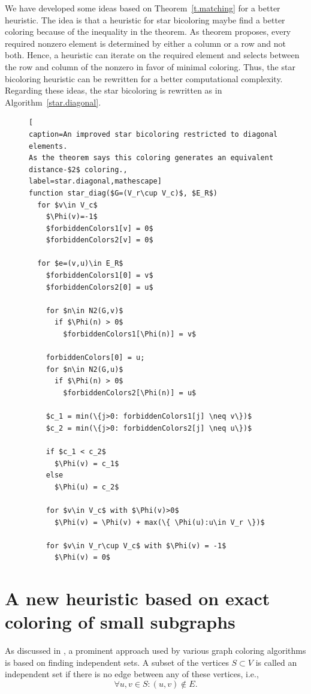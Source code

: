 \documentclass[12pt, twoside,a4paper,toc=bibliography]{scrbook}
\newcommand{\coderef}[1]{Algorithm~\protect\ref{#1}}
\begin{document}
We have developed some ideas based on Theorem~\ref{t.matching}
for a better heuristic. The idea is that a heuristic for star bicoloring maybe
find a better coloring because of the inequality in the theorem.
As theorem proposes, every required nonzero element
is determined by either a column or a row and not both. Hence, a heuristic
can iterate on the required element and selects between the row and column of
the nonzero in favor of minimal coloring.
Thus, the star bicoloring heuristic can be rewritten for a better computational complexity.
Regarding these ideas, the star bicoloring is rewritten as in \coderef{star.diagonal}.
\begin{figure}
\begin{lstlisting}[
caption=An improved star bicoloring restricted to diagonal elements.
As the theorem says this coloring generates an equivalent distance-$2$ coloring.,
label=star.diagonal,mathescape]
function star_diag($G=(V_r\cup V_c)$, $E_R$)
  for $v\in V_c$
    $\Phi(v)=-1$
    $forbiddenColors1[v] = 0$
    $forbiddenColors2[v] = 0$

  for $e=(v,u)\in E_R$
    $forbiddenColors1[0] = v$
    $forbiddenColors2[0] = u$

    for $n\in N2(G,v)$
      if $\Phi(n) > 0$
        $forbiddenColors1[\Phi(n)] = v$

    forbiddenColors[0] = u;
    for $n\in N2(G,u)$
      if $\Phi(n) > 0$
        $forbiddenColors2[\Phi(n)] = u$

    $c_1 = min(\{j>0: forbiddenColors1[j] \neq v\})$
    $c_2 = min(\{j>0: forbiddenColors2[j] \neq u\})$

    if $c_1 < c_2$
      $\Phi(v) = c_1$
    else
      $\Phi(u) = c_2$

    for $v\in V_c$ with $\Phi(v)>0$
      $\Phi(v) = \Phi(v) + max(\{ \Phi(u):u\in V_r \})$

    for $v\in V_r\cup V_c$ with $\Phi(v) = -1$
      $\Phi(v) = 0$
\end{lstlisting}
\end{figure}

\section{A new heuristic based on exact coloring of small subgraphs}
\label{s.exact}
As discussed in \cite{Fomin2013}, a prominent approach used by various graph coloring
algorithms is based on finding independent sets. A subset of the vertices $S\subset V$ is
called an independent set if there is no edge between any of these vertices, i.e.,
$$
\forall u,v\in S: (u,v)\notin E.
$$
\end{document}
